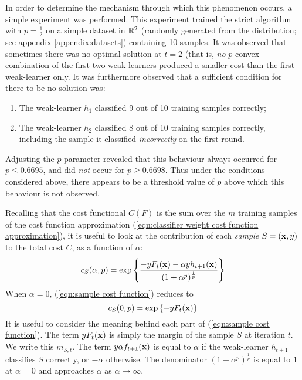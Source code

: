 In order to determine the mechanism through which this phenomenon
occurs, a simple experiment was performed.  This experiment trained
the strict algorithm with $p = \frac{1}{2}$ on a simple dataset in
$\mathbb{R}^2$ (randomly generated from the  distribution; see
appendix \ref{appendix:datasets}) containing 10 samples. 
It was observed that sometimes there was no optimal solution 
at $t=2$ (that is,  \emph{no} $p$-convex combination of the first two
weak-learners produced a smaller cost than the first weak-learner
only.  It was furthermore observed that a sufficient condition for
there to be no solution was: 
%
\begin{enumerate}
\item	The weak-learner $h_1$ classified 9 out of 10 training samples
	correctly; 
\item	The weak-learner $h_2$ classified 8 out of 10 training samples
	correctly, including the sample it classified
	\emph{incorrectly} on the first round.
\end{enumerate}
%
Adjusting the $p$ parameter revealed that this behaviour always
occurred for $p \leq 0.6695$, and did \emph{not} occur for $p \geq
0.6698$.  Thus under the conditions considered above, there appears to
be a threshold value of $p$ above which this behaviour is not
observed.

Recalling that the cost functional $C(F)$ is the sum over the $m$
training samples of the cost function approximation
(\ref{eqn:classifier weight cost function approximation}), it is
useful to look at the contribution of each \emph{sample} $S = (\mathbf{x},
y)$ to the total cost $C$, as a function of $\alpha$:
%
\begin{equation}
\label{eqn:sample cost function}
c_S(\alpha, p) = \exp \left\{ \frac{-y F_t(\mathbf{x}) - \alpha y h_{t+1}
(\mathbf{x})}{(1 + \alpha^p)^{\frac{1}{p}}} \right\}
\end{equation}
%
When $\alpha = 0$, (\ref{eqn:sample cost function}) reduces to
%
\begin{equation}
c_S(0, p) = \exp \left\{ -y F_t(\mathbf{x}) \right\}
\end{equation}
%
It is useful to consider the meaning behind each part of
(\ref{eqn:sample cost function}).  The term $y F_t(\mathbf{x})$ is simply
the margin of the sample $S$ at iteration $t$.  We write this $m_{S,
t}$.  The term $y \alpha f_{t+1}(\mathbf{x})$ is equal to $\alpha$ if the
weak-learner $h_{t+1}$ classifies $S$ correctly, or $-\alpha$
otherwise.  The denominator $(1 + \alpha^p)^{\frac{1}{p}}$ is equal to
$1$ at $\alpha=0$ and approaches $\alpha$ as $\alpha \rightarrow
\infty$.

